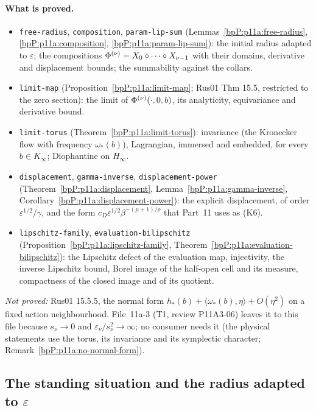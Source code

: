 \paragraph{What is proved.}
\begin{itemize}
\item \texttt{free-radius}, \texttt{composition}, \texttt{param-lip-sum} (Lemmas~\ref{bpP:p11a:free-radius}, \ref{bpP:p11a:composition}, \ref{bpP:p11a:param-lip-sum}): the initial radius adapted to $\varepsilon$; the compositions $\Phi^{(\nu)}=X_0\circ\dots\circ X_{\nu-1}$ with their domains, derivative and displacement bounds; the summability against the collars.
\item \texttt{limit-map} (Proposition~\ref{bpP:p11a:limit-map}; Rus01 Thm 15.5, restricted to the zero section): the limit of $\Phi^{(\nu)}(\cdot,0,b)$, its analyticity, equivariance and derivative bound.
\item \texttt{limit-torus} (Theorem~\ref{bpP:p11a:limit-torus}): invariance (the Kronecker flow with frequency $\omega_*(b)$), Lagrangian, immersed and embedded, for every $b\in K_\infty$; Diophantine on $H_\infty$.
\item \texttt{displacement}, \texttt{gamma-inverse}, \texttt{displacement-power} (Theorem~\ref{bpP:p11a:displacement}, Lemma~\ref{bpP:p11a:gamma-inverse}, Corollary~\ref{bpP:p11a:displacement-power}): the explicit displacement, of order $\varepsilon^{1/2}/\gamma$, and the form $c_D\varepsilon^{1/2}\beta^{-(\mu+1)/\rho}$ that Part~11 uses as (K6).
\item \texttt{lipschitz-family}, \texttt{evaluation-bilipschitz} (Proposition~\ref{bpP:p11a:lipschitz-family}, Theorem~\ref{bpP:p11a:evaluation-bilipschitz}): the Lipschitz defect of the evaluation map, injectivity, the inverse Lipschitz bound, Borel image of the half-open cell and its measure, compactness of the closed image and of its quotient.
\end{itemize}
\emph{Not proved:} Rus01 15.5.5, the normal form $h_*(b)+\langle\omega_*(b),\eta\rangle+O(\eta^2)$ on a fixed action neighbourhood. File~11a-3 (T1, review P11A3-06) leaves it to this file because $s_\nu\to0$ and $\varepsilon_\nu/s_\nu^2\to\infty$; no consumer needs it (the physical statements use the torus, its invariance and its symplectic character; Remark~\ref{bpP:p11a:no-normal-form}).

\subsection{The standing situation and the radius adapted to $\varepsilon$}\label{bpP:p11a:s4-conv}

